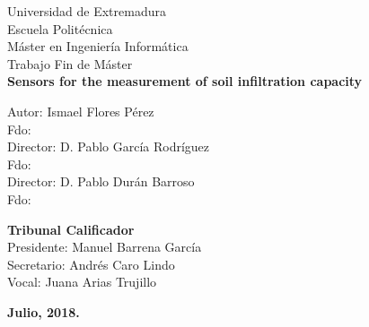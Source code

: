 \begin{center}
{\huge Universidad de Extremadura}\\[0.5cm]
{\LARGE Escuela Politécnica}\\[0.5cm]
{\Large Máster en Ingeniería Informática}\\[0.5cm]
{\Large Trabajo Fin de Máster}\\[0.3cm]
{\Large \textbf{Sensors for the measurement of soil infiltration capacity}}\\[0.5cm]
\end{center}


\begin{center}
{\normalsize Autor: Ismael Flores Pérez}\\[0.05cm]
{\normalsize Fdo:}\\[0.10cm]
{\normalsize Director: D. Pablo García Rodríguez}\\[0.05cm]
{\normalsize Fdo:}\\[0.10cm]
{\normalsize Director: D. Pablo Durán Barroso}\\[0.05cm]
{\normalsize Fdo:}\\[0.6cm]
\end{center}


\begin{flushleft}
{\normalsize \textbf{Tribunal Calificador}}\\[0.2cm]

{\normalsize Presidente: Manuel Barrena García}\\[0.2cm]
{\normalsize Secretario: Andrés Caro Lindo}\\[0.2cm]
{\normalsize Vocal: Juana Arias Trujillo}\\[0.2cm]
\end{flushleft}


\begin{center}
\vspace*{0.2cm}
\textbf{Julio, 2018.}
\end{center}



